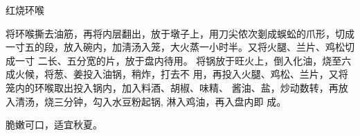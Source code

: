 \begin{recipe}{红烧环喉}

\ingredients


\preparation

\step 将环喉撕去油筋，再将内层翻出，放于墩子上，用刀尖侬次剗成蜈蚣的爪形，切成
一寸五的段，放入碗内，加淸汤入笼，大火蒸一小时半。又将火腿、兰片、鸡松切成一寸
二长、五分宽的片，放于盘内待用。
\step 将锅放于旺火上，倒入化油，烧至六成火候，将葱、姜投入油锅，稍炸，打去不
用，再投入火腿、鸡松、兰片，又将笼内的环喉取出投入锅内，加入料酒、胡椒、味精、
酱油、盐，炒动数转，再放入清汤，烧三分钟，勾入水豆粉起锅, 淋入鸡油，再入盘内即
成。

\features

脆嫩可口，适宜秋夏。

\end{recipe}

